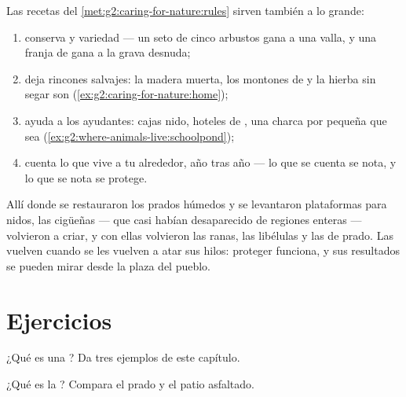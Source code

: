 \begin{method}\label{met:g5:biodiversity:help}
Las recetas del \cref{met:g2:caring-for-nature:rules} sirven también a
lo grande:
\begin{enumerate}
  \item conserva y  variedad --- un seto de cinco arbustos gana a
        una valla, y una franja de  gana a la grava desnuda;
  \item deja rincones salvajes: la madera muerta, los montones de
         y la hierba sin segar son 
        (\cref{ex:g2:caring-for-nature:home});
  \item ayuda a los ayudantes: cajas nido, hoteles de , una
        charca por pequeña que sea
        (\cref{ex:g2:where-animals-live:schoolpond});
  \item cuenta lo que vive a tu alrededor, año tras año --- lo que se
        cuenta se nota, y lo que se nota se protege.
\end{enumerate}
\end{method}

\begin{example}\label{ex:g5:biodiversity:storks}
Allí donde se restauraron los prados húmedos y se levantaron
plataformas para nidos, las cigüeñas --- que casi habían desaparecido
de regiones enteras --- volvieron a criar, y con ellas volvieron las
ranas, las libélulas y las  de prado. Las  vuelven
cuando se les vuelven a atar sus hilos: proteger funciona, y sus
resultados se pueden mirar desde la plaza del pueblo.
\end{example}

\section{Ejercicios}

\begin{exercise}[$\star$]\label{exo:g5:biodiversity:1}
¿Qué es una ? Da tres ejemplos de este capítulo.
\end{exercise}

\begin{exercise}[$\star$]\label{exo:g5:biodiversity:2}
¿Qué es la ? Compara el prado y el patio asfaltado.
\end{exercise}

